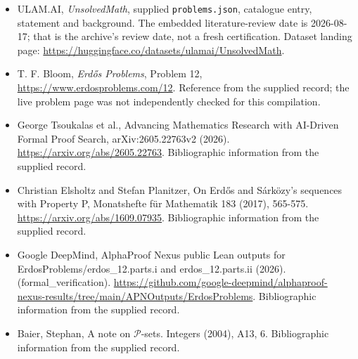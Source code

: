 \documentclass[11pt,a4paper]{article}
\begin{document}
{\small

\begin{itemize}

\item[\hypertarget{source:statement:1}{S1}] ULAM.AI, \emph{UnsolvedMath}, supplied \texttt{problems.json}, catalogue entry, statement and background. The embedded literature-review date is 2026-08-17; that is the archive’s review date, not a fresh certification. Dataset landing page: \url{https://huggingface.co/datasets/ulamai/UnsolvedMath}.

\item[\hypertarget{source:statement:2}{S2}] T. F. Bloom, \emph{Erdős Problems}, Problem 12, \url{https://www.erdosproblems.com/12}. Reference from the supplied record; the live problem page was not independently checked for this compilation.

\item[\hypertarget{source:statement:3}{S3}] George Tsoukalas et al., Advancing Mathematics Research with AI-Driven Formal Proof Search, arXiv:2605.22763v2 (2026). \url{https://arxiv.org/abs/2605.22763}. Bibliographic information from the supplied record.

\item[\hypertarget{source:statement:4}{S4}] Christian Elsholtz and Stefan Planitzer, On Erdős and Sárközy's sequences with Property P, Monatshefte für Mathematik 183 (2017), 565-575. \url{https://arxiv.org/abs/1609.07935}. Bibliographic information from the supplied record.

\item[\hypertarget{source:statement:5}{S5}] Google DeepMind, AlphaProof Nexus public Lean outputs for ErdosProblems/erdos\_12.parts.i and erdos\_12.parts.ii (2026). (formal\_verification). \url{https://github.com/google-deepmind/alphaproof-nexus-results/tree/main/APNOutputs/ErdosProblems}. Bibliographic information from the supplied record.

\item[\hypertarget{source:statement:6}{S6}] Baier, Stephan, A note on {$\mathcal P$}-sets. Integers (2004), A13, 6. Bibliographic information from the supplied record.

\end{itemize}

}

\label{end:statement}
\end{document}
